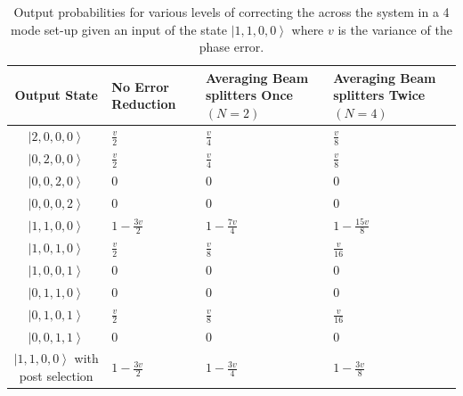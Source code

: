 \documentclass[aps,pra,twocolumn,superscriptaddress,numerical,floatfix]{revtex4-1}
\begin{document}
\begin{widetext}
\begin{table}
{\begin{centering}
	\begin{tabular}{|c|>{\centering}p{4cm}|>{\centering}p{4cm}|>{\centering}p{4cm}|}
		\hline 
		Output State & No Error Reduction & Averaging Beam splitters Once $\left(N=2\right)$ & Averaging Beam splitters Twice $\left(N=4\right)$\tabularnewline
		\hline 
		\hline 
		$\left|2,0,0,0\right\rangle $ & $\frac{v}{2}$ & $\frac{v}{4}$ & $\frac{v}{8}$\tabularnewline
		\hline 
		$\left|0,2,0,0\right\rangle $ & $\frac{v}{2}$ & $\frac{v}{4}$ & $\frac{v}{8}$\tabularnewline
		\hline 
		$\left|0,0,2,0\right\rangle $ & $0$ & $0$ & $0$\tabularnewline
		\hline 
		$\left|0,0,0,2\right\rangle $ & $0$ & $0$ & $0$\tabularnewline
		\hline 
		$\left|1,1,0,0\right\rangle $ & $1-\frac{3v}{2}$ & $1-\frac{7v}{4}$ & $1-\frac{15v}{8}$\tabularnewline
		\hline 
		$\left|1,0,1,0\right\rangle $ & $\frac{v}{2}$ & $\frac{v}{8}$ & $\frac{v}{16}$\tabularnewline
		\hline 
		$\left|1,0,0,1\right\rangle $ & $0$ & $0$ & $0$\tabularnewline
		\hline 
		$\left|0,1,1,0\right\rangle $ & $0$ & $0$ & $0$\tabularnewline
		\hline 
		$\left|0,1,0,1\right\rangle $ & $\frac{v}{2}$ & $\frac{v}{8}$ & $\frac{v}{16}$\tabularnewline
		\hline 
		$\left|0,0,1,1\right\rangle $ & $0$ & $0$ & $0$\tabularnewline
		\hline 
		$\left|1,1,0,0\right\rangle $ with post selection & $1-\frac{3v}{2}$ & $1-\frac{3v}{4}$ & $1-\frac{3v}{8}$\tabularnewline
		\hline 
	\end{tabular}
	\par\end{centering}

}

\caption[Output probabilities for various levels of correcting the across the
system in a 4 mode set-up given an input of the state $\left|1,1,0,0\right\rangle $.]{Output probabilities for various levels of correcting the across
the system in a 4 mode set-up given an input of the state $\left|1,1,0,0\right\rangle $
where $v$ is the variance of the phase error. \label{tab:1,1 photon output prob as}}
\end{table}
\end{widetext}
\end{document}
